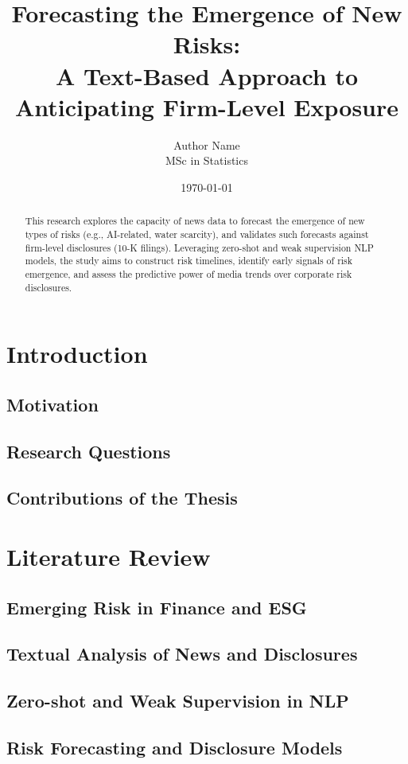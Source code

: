\documentclass[12pt]{report}
\title{Forecasting the Emergence of New Risks: \\
A Text-Based Approach to Anticipating Firm-Level Exposure}
\author{Author Name \\ MSc in Statistics}
\date{\today}
\begin{document}
\maketitle

\begin{abstract}
This research explores the capacity of news data to forecast the emergence of new types of risks (e.g., AI-related, water scarcity), and validates such forecasts against firm-level disclosures (10-K filings). Leveraging zero-shot and weak supervision NLP models, the study aims to construct risk timelines, identify early signals of risk emergence, and assess the predictive power of media trends over corporate risk disclosures.
\end{abstract}

\tableofcontents
\newpage

\chapter{Introduction}
\section{Motivation}
\section{Research Questions}
\section{Contributions of the Thesis}

\chapter{Literature Review}
\section{Emerging Risk in Finance and ESG}
\section{Textual Analysis of News and Disclosures}
\section{Zero-shot and Weak Supervision in NLP}
\section{Risk Forecasting and Disclosure Models}
\end{document}
